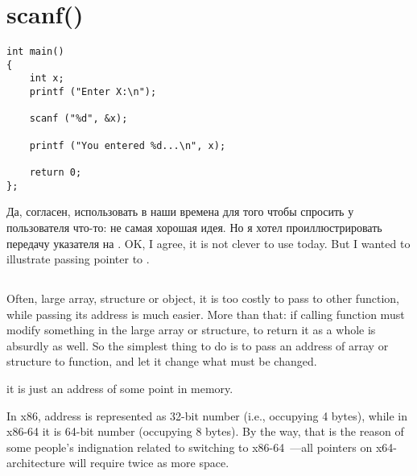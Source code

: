 ﻿\section{scanf()}
\label{label_scanf}


\begin{lstlisting}
int main() 
{
	int x;
	printf ("Enter X:\n");

	scanf ("%d", &x);

	printf ("You entered %d...\n", x);

	return 0;
};
\end{lstlisting}

\IFRU
{Да, согласен, использовать \scanf в наши времена для того чтобы спросить у пользователя что-то: 
не самая хорошая идея.
Но я хотел проиллюстрировать передачу указателя на \Tint.}
{OK, I agree, it is not clever to use \scanf today. But I wanted to illustrate passing pointer to \Tint.}

\subsection{}
\index{\CLanguageElements!\Pointers}

{Often, large array, structure or object, it is too costly to pass to other function, 
while passing its address is much easier.}
{More than that: if calling function must modify something in the large array or structure,
to return it as a whole is absurdly as well.}
{So the simplest thing to do is to pass an address of array or structure to function,
and let it change what must be changed.}

 \CCpp {}
{it is just an address of some point in memory.}

{In x86, address is represented as 32-bit number (i.e., occupying 4 bytes), while in x86-64 it is 64-bit number
(occupying 8 bytes).}
{By the way, that is the reason of some people's indignation related to switching to x86-64~---all pointers
on x64-architecture will require twice as more space.}

